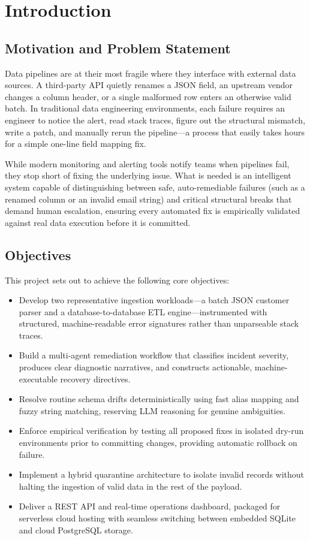 \documentclass[11pt]{article}
\begin{document}
\section{Introduction}

\subsection{Motivation and Problem Statement}
Data pipelines are at their most fragile where they interface with external data sources. A third-party API quietly renames a JSON field, an upstream vendor changes a column header, or a single malformed row enters an otherwise valid batch. In traditional data engineering environments, each failure requires an engineer to notice the alert, read stack traces, figure out the structural mismatch, write a patch, and manually rerun the pipeline—a process that easily takes hours for a simple one-line field mapping fix. 

While modern monitoring and alerting tools notify teams when pipelines fail, they stop short of fixing the underlying issue. What is needed is an intelligent system capable of distinguishing between safe, auto-remediable failures (such as a renamed column or an invalid email string) and critical structural breaks that demand human escalation, ensuring every automated fix is empirically validated against real data execution before it is committed.

\subsection{Objectives}
This project sets out to achieve the following core objectives:
\begin{itemize}
  \item Develop two representative ingestion workloads—a batch JSON customer parser and a database-to-database ETL engine—instrumented with structured, machine-readable error signatures rather than unparseable stack traces.
  \item Build a multi-agent remediation workflow that classifies incident severity, produces clear diagnostic narratives, and constructs actionable, machine-executable recovery directives.
  \item Resolve routine schema drifts deterministically using fast alias mapping and fuzzy string matching, reserving LLM reasoning for genuine ambiguities.
  \item Enforce empirical verification by testing all proposed fixes in isolated dry-run environments prior to committing changes, providing automatic rollback on failure.
  \item Implement a hybrid quarantine architecture to isolate invalid records without halting the ingestion of valid data in the rest of the payload.
  \item Deliver a REST API and real-time operations dashboard, packaged for serverless cloud hosting with seamless switching between embedded SQLite and cloud PostgreSQL storage.
\end{itemize}
\end{document}
